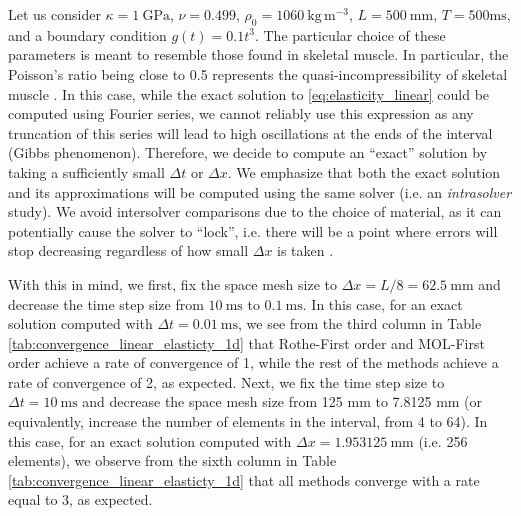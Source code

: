 \documentclass{sfuthesis}
\numberwithin{equation}{section}
\numberwithin{figure}{chapter}
\numberwithin{table}{chapter}
\theoremstyle{definition}
\begin{document}
Let us consider $\kappa = 1 \ \text{GPa}$, $\nu = 0.499$, $\rho_0 = 1060 \ \text{kg} \, \text{m}^{-3}$, $L = 500 \ \text{mm}$, $T = 500 \text{ms}$, and a boundary condition $g(t) = 0.1t^3$. The particular choice of these parameters is meant to resemble those found in skeletal muscle. In particular, the Poisson's ratio being close to 0.5 represents the quasi-incompressibility of skeletal muscle \cite{BaskinPaolini}.
In this case, while the exact solution to \eqref{eq:elasticity_linear} could be computed using Fourier series, we cannot reliably use this expression as any truncation of this series will lead to high oscillations at the ends of the interval (Gibbs phenomenon). Therefore, we decide to compute an ``exact'' solution by taking a sufficiently small $\Delta t$ or $\Delta x$. We emphasize that both the exact solution and its approximations will be computed using the same solver (i.e. an \textit{intrasolver} study). We avoid intersolver comparisons due to the choice of material, as it can potentially cause the solver to ``lock'', i.e. there will be a point where errors will stop decreasing regardless of how small $\Delta x$ is taken \cite{BabushkaSuri1992}.

With this in mind, we first, fix the space mesh size to $\Delta x = L/8 = 62.5 \ \text{mm}$ and decrease the time step size from $10 \ \text{ms}$ to $0.1 \ \text{ms}$. In this case, for an exact solution computed with $\Delta t = 0.01 \ \text{ms}$, we see from the third column in Table \ref{tab:convergence_linear_elasticty_1d} that Rothe-First order and MOL-First order achieve a rate of convergence of 1, while the rest of the methods achieve a rate of convergence of 2, as expected. Next, we fix the time step size to $\Delta t = 10 \ \text{ms}$ and decrease the space mesh size from 125 mm to 7.8125 mm (or equivalently, increase the number of elements in the interval, from 4 to 64). In this case, for an exact solution computed with $\Delta x = 1.953125 \ \text{mm}$ (i.e. 256 elements), we observe from the sixth column in Table \ref{tab:convergence_linear_elasticty_1d} that all methods converge with a rate equal to 3, as expected.
\end{document}
